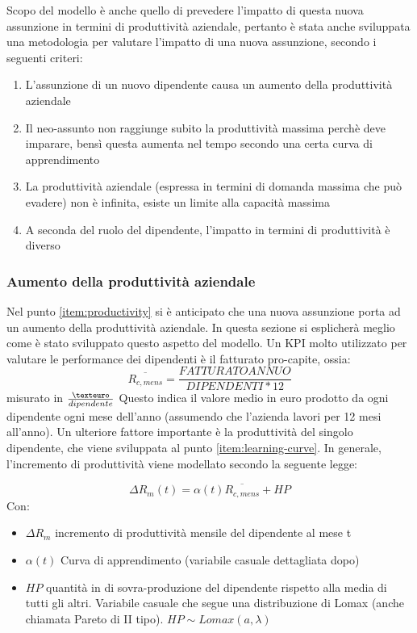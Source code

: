 \documentclass{article}
\begin{document}
Scopo del modello è anche quello di prevedere l'impatto di questa nuova assunzione in termini di produttività aziendale, pertanto è stata anche sviluppata una metodologia per valutare l'impatto di una nuova assunzione, secondo i seguenti criteri:
\begin{enumerate}
    \item \label{item:productivity} L'assunzione di un nuovo dipendente causa un aumento della produttività aziendale
    \item \label{item:learning-curve} Il neo-assunto non raggiunge subito la produttività massima perchè deve imparare, bensì questa aumenta nel tempo secondo una certa curva di apprendimento
    \item La produttività aziendale (espressa in termini di domanda massima che può evadere) non è infinita, esiste un limite alla capacità massima
    \item A seconda del ruolo del dipendente, l'impatto in termini di produttività è diverso
\end{enumerate}

\subsubsection{Aumento della produttività aziendale}
Nel punto \ref{item:productivity} si è anticipato che una nuova assunzione porta ad un aumento della produttività aziendale. In questa sezione si esplicherà meglio come è stato sviluppato questo aspetto del modello. 
Un KPI molto utilizzato per valutare le performance dei dipendenti è il fatturato pro-capite, ossia:
\[
\overline{R_{c, mens}} = \frac{FATTURATO ANNUO}{DIPENDENTI * 12}
\]
misurato in $\frac{\texteuro}{dipendente}$
Questo indica il valore medio in euro prodotto da ogni dipendente ogni mese dell'anno (assumendo che l'azienda lavori per 12 mesi all'anno). 
Un ulteriore fattore importante è la produttività del singolo dipendente, che viene sviluppata al punto \ref{item:learning-curve}. 
In generale, l'incremento di produttività viene modellato secondo la seguente legge:

\begin{equation}
\Delta R_m(t) = \alpha (t)\overline{R_{c, mens}} + HP
\label{eq:general}
\end{equation}
Con: 
\begin{itemize}
    \item $\Delta R_m$ incremento di produttività mensile del dipendente al mese t
    \item $\alpha (t)$ Curva di apprendimento (variabile casuale dettagliata dopo)
    \item $HP$ quantità in \texteuro  di sovra-produzione del dipendente rispetto alla media di tutti gli altri. Variabile casuale che segue una distribuzione di Lomax (anche chiamata Pareto di II tipo). $HP \sim Lomax(a, \lambda)$
\end{itemize}
\end{document}
